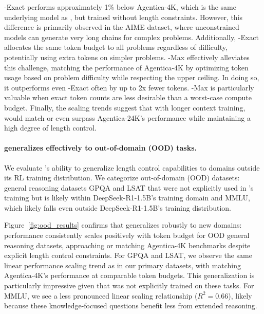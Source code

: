 \model{}-Exact performs approximately 1\% below Agentica-4K, which is the same underlying model as \model{}, but trained without length constraints. However, this difference is primarily observed in the AIME dataset, where unconstrained models can generate very long chains for complex problems. Additionally, \model{}-Exact allocates the same token budget to all problems regardless of difficulty, potentially using extra tokens on simpler problems.
\model{}-Max effectively alleviates this challenge, matching the performance of Agentica-4K by optimizing token usage based on problem difficulty while respecting the upper ceiling. In doing so, it outperforms even \model{}-Exact often by up to 2x fewer tokens. \model{}-Max is particularly valuable when exact token counts are less desirable than a worst-case compute budget. 
Finally, the scaling trends suggest that with longer context training, \model{} would match or even surpass Agentica-24K's performance while maintaining a high degree of length control.

\paragraph{\model{} generalizes effectively to out-of-domain (OOD) tasks.}



We evaluate \model{}'s ability to generalize length control capabilities to domains outside its RL training distribution. We categorize out-of-domain (OOD) datasets: general reasoning datasets GPQA and LSAT that were not explicitly used in \model{}'s training but is likely within DeepSeek-R1-1.5B's training domain and MMLU, which likely falls even outside DeepSeek-R1-1.5B's training distribution.

Figure~\ref{fig:ood_results} confirms that \model{} generalizes robustly to new domains: performance consistently scales positively with token budget for OOD general reasoning datasets, approaching or matching Agentica-4K benchmarks despite explicit length control constraints.
For GPQA and LSAT, we observe the same linear performance scaling trend as in our primary datasets, with \model{} matching Agentica-4K's performance at comparable token budgets. This generalization is particularly impressive given that \model{} was not explicitly trained on these tasks. For MMLU, we see a less pronounced linear scaling relationship ($R^2 = 0.66$), likely because these knowledge-focused questions benefit less from extended reasoning.

